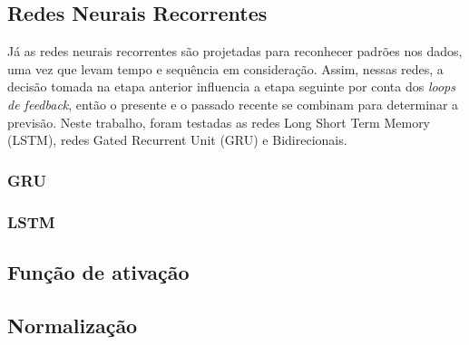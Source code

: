         
\subsection*{Redes Neurais Recorrentes}
  
Já as redes neurais recorrentes são projetadas para reconhecer padrões nos dados, uma vez que levam tempo e sequência em consideração. Assim, nessas redes, a decisão tomada na etapa anterior influencia a etapa seguinte por conta dos \textit{loops de feedback}, então o presente e o passado recente se combinam para determinar a previsão. Neste trabalho, foram testadas as redes Long Short Term Memory (LSTM), redes Gated Recurrent Unit (GRU) e Bidirecionais.
  
\subsubsection*{GRU}

\subsubsection*{LSTM}

\subsection*{Função de ativação}


\subsection*{Normalização}
